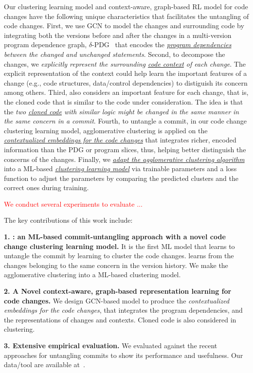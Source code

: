 Our clustering learning model and context-aware, graph-based RL model
for code changes have the following unique characteristics that
facilitates the untangling of code changes. First, we use GCN to model
the changes and surrounding code by integrating both the versions
before and after the changes in a multi-version program dependence
graph, $\delta$-PDG~\cite{flexeme-fse20} that encodes the {\em
  \underline{program dependencies} between the changed and unchanged
  statements}. Second, to decompose the changes, we {\em explicitly
  represent the surrounding \underline{code context} of each
  change}. The explicit representation of the context could help
{\tool} learn the important features of a change (e.g., code
structures, data/control dependencies) to distiguish its concern among
others. Third, {\tool} also considers an important feature for each
change, that is, the cloned code that is similar to the code under
consideration. The idea is that the {\em two \underline{cloned code}
  with similar logic might be changed in the same manner in the same
  concern in a commit}. Fourth, to untangle a commit, in our code
change clustering learning model, agglomerative clustering is applied
on the {\em \underline{contextualized embeddings for the code
    changes}} that integrates richer, encoded information than the PDG
or program slices, thus, helping better distinguish the concerns of
the changes. Finally, we {\em \underline{adapt the agglomerative
    clustering algorithm}} into a ML-based {\em \underline{clustering
    learning model}} via trainable parameters and a loss function to
  adjust the parameters by comparing the predicted clusters and the
  correct ones during training.


\textcolor{red}{We conduct several experiments to evaluate {\tool}...}

The key contributions of this work include:

{\bf 1. {\tool}: an ML-based commit-untangling approach with a novel
  code change clustering learning model.} It is the first ML model
that learns to untangle the commit by learning to cluster the code
changes.  {\tool} learns from the changes belonging to the same
concern in the version history. We make the agglomerative clustering
into a ML-based clustering model.

{\bf 2. A Novel context-aware, graph-based representation learning for
  code changes.} We design GCN-based model to produce the {\em
  contextualized embeddings for the code changes}, that
integrates the program dependencies, and the representations of changes
and contexts. Cloned code is also considered in clustering.

{\bf 3. Extensive empirical evaluation.} We evaluated {\tool} against
the recent approaches for untangling commits to show its performance
and usefulness. Our data/tool are available at~\cite{utango-website}.
